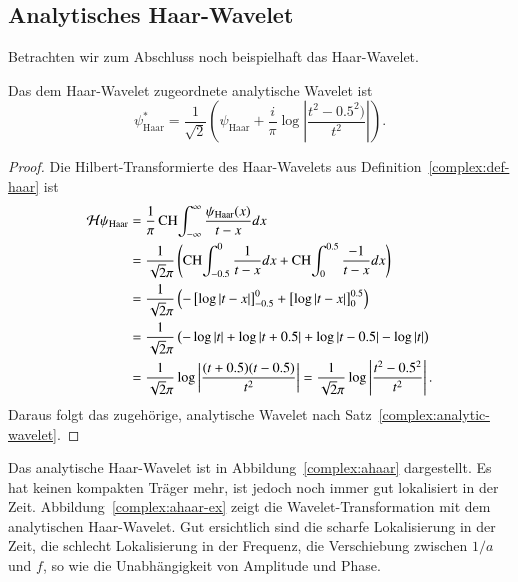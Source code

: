 \subsection{Analytisches Haar-Wavelet}
Betrachten wir zum Abschluss noch beispielhaft das Haar-Wavelet.
\begin{satz}
    Das dem Haar-Wavelet zugeordnete analytische Wavelet ist
    \[\psi^\ast_{\text{Haar}} = \frac{1}{\sqrt{2}}\left(\psi_{\text{Haar}} + \frac{i}{\pi} \log\left|\frac{t^2-0.5^2)}{t^2}\right|\right).\]
\end{satz}

\begin{proof}
    Die Hilbert-Transformierte des Haar-Wavelets aus Definition~\ref{complex:def-haar} ist
    \begin{align*}
    \mathcal{H} \psi_{\text{Haar}}
    &= \frac{1}{\pi} \CH\int_{-\infty}^{\infty} \frac{\psi_{\text{Haar}}(x)}{t-x} dx\\
    &= \frac{1}{\sqrt2\pi}\left( \CH\int_{-0.5}^{0} \frac{1}{t-x}dx + \CH\int_{0}^{0.5} \frac{-1}{t-x}dx \right)\\
    &= \frac{1}{\sqrt2\pi} \left( -\left[\log \left|t-x\right| \right]_{-0.5}^{0} + \left[\log\left|t-x\right| \right]_{0}^{0.5} \right)\\
    &= \frac{1}{\sqrt2\pi} \left( -\log\left|t\right| + \log\left|t+0.5\right| + \log\left|t-0.5\right| - \log\left|t\right|\right)\\
    &= \frac{1}{\sqrt2\pi} \log\left|\frac{(t+0.5)(t-0.5)}{t^2}\right|
    = \frac{1}{\sqrt2\pi} \log\left|\frac{t^2-0.5^2}{t^2}\right|.
    \end{align*}
    Daraus folgt das zugehörige, analytische Wavelet nach Satz~\ref{complex:analytic-wavelet}.
\end{proof}

Das analytische Haar-Wavelet ist in Abbildung~\ref{complex:ahaar} dargestellt.
Es hat keinen kompakten Träger mehr, ist jedoch noch immer gut lokalisiert in der Zeit.
Abbildung~\ref{complex:ahaar-ex} zeigt die Wavelet-Transformation mit dem analytischen Haar-Wavelet.
Gut ersichtlich sind die scharfe Lokalisierung in der Zeit, die schlecht Lokalisierung in der Frequenz, die Verschiebung zwischen $1/a$ und $f$, so wie die Unabhängigkeit von Amplitude und Phase.

